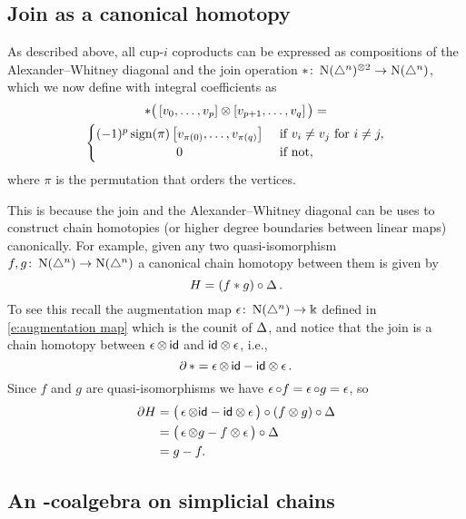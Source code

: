 \subsection{Join as a canonical homotopy}

As described above, all cup-$i$ coproducts can be expressed as compositions of the Alexander--Whitney diagonal and the join operation $\ast \colon \operatorname{N}(\triangle^n)^{\otimes 2} \to \operatorname{N}(\triangle^n)$, which we now define with integral coefficients as
\begin{multline}
\ast \big(\left[v_0, \dots, v_p \right] \ot \left[v_{p+1}, \dots, v_q\right]\big) = \\
\begin{cases} (-1)^{p} \sign(\pi) \left[v_{\pi(0)}, \dots, v_{\pi(q)}\right] & \text{ if } v_i \neq v_j \text{ for } i \neq j, \\
\hfil 0 & \text{ if not}, \end{cases}
\end{multline}
where $\pi$ is the permutation that orders the vertices.

This is because the join and the Alexander--Whitney diagonal can be uses to construct chain homotopies (or higher degree boundaries between linear maps) canonically.
For example, given any two quasi-isomorphism $f, g \colon \operatorname{N}(\triangle^n) \to \operatorname{N}(\triangle^n)$ a canonical chain homotopy between them is given by
\[
H = (f \ast g) \circ \operatorname{\Delta}.
\]
To see this recall the augmentation map $\operatorname{\epsilon} \colon \operatorname{N}(\triangle^n) \to \Bbbk$ defined in \eqref{e:augmentation map} which is the counit of $\operatorname{\Delta}$, and notice that the join is a chain homotopy between $\operatorname{\epsilon} \otimes \, \mathsf{id}$ and $\mathsf{id} \otimes \operatorname{\epsilon}$, i.e.,
\begin{equation}
\partial \operatorname{\ast} = \operatorname{\epsilon} \otimes \, \mathsf{id} - \mathsf{id} \otimes \operatorname{\epsilon}.
\end{equation}
Since $f$ and $g$ are quasi-isomorphisms we have $\operatorname{\epsilon} \circ f = \operatorname{\epsilon} \circ g = \operatorname{\epsilon}$, so
\begin{align*}
\partial H &=
\big( \operatorname{\epsilon} \otimes \mathsf{id} - \mathsf{id} \otimes \operatorname{\epsilon} \big) \circ (f \otimes g) \circ \operatorname{\Delta} \\ &=
\big(\operatorname{\epsilon} \otimes g - f \otimes \operatorname{\epsilon} \big) \circ \operatorname{\Delta} \\ &= g - f.
\end{align*}

\subsection{An \pdfEinfty-coalgebra on simplicial chains} \label{ss:e-infty generalization}

